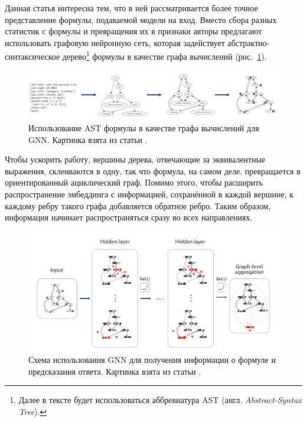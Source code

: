 Данная статья интересна тем, что в ней рассматривается более точное представление формулы, подаваемой модели на вход. Вместо сбора разных статистик с формулы и превращения их в признаки авторы предлагают использовать графовую нейронную сеть, которая задействует абстрактно-синтаксическое дерево\footnote{Далее в тексте будет использоваться аббревиатура AST (англ. \textit{Abstract-Syntax Tree}).} формулы в качестве графа вычислений (рис.~\ref{gnn-for-scheduling-architecture}).

\begin{figure}[ht]
\begin{center}
    \includegraphics[scale=0.24]{./assets/gnn-for-scheduling-architecture.png}
    \caption{\label{gnn-for-scheduling-architecture} Использование AST формулы в качестве графа вычислений для GNN. Картинка взята из статьи \cite{gnn-for-scheduling-paper}.}
\end{center}
\end{figure}

Чтобы ускорить работу, вершины дерева, отвечающие за эквивалентные выражения, склеиваются в одну, так что формула, на самом деле, превращается в ориентированный ациклический граф. Помимо этого, чтобы расширить распространение эмбеддинга с информацией, сохранённой в каждой вершине, к каждому ребру такого графа добавляется обратное ребро. Таким образом, информация начинает распространяться сразу во всех направлениях.

\begin{figure}[ht]
\begin{center}
    \includegraphics[scale=0.25]{./assets/gnn-for-scheduling-process.png}
    \caption{\label{gnn-for-scheduling-process} Схема использования GNN для получения информации о формуле и предсказания ответа. Картинка взята из статьи \cite{gnn-for-scheduling-paper}.}
\end{center}
\end{figure}

